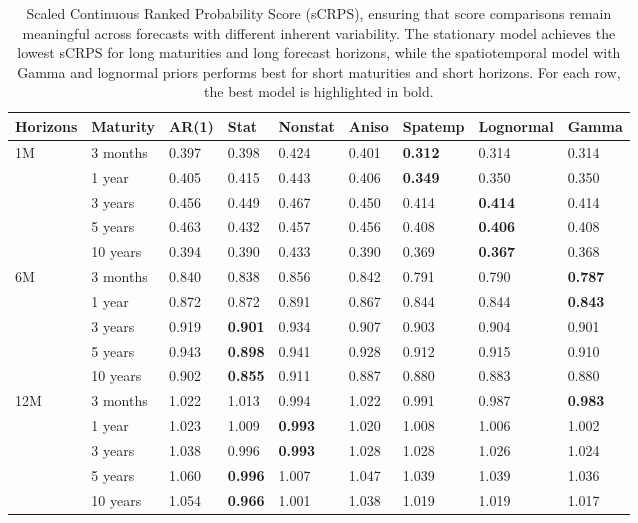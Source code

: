 \documentclass[
  12pt]{article}
\begin{document}
\begin{table}[t!p]
    \centering
    \caption{Scaled Continuous Ranked Probability Score (sCRPS), ensuring that score comparisons remain meaningful across forecasts with different inherent variability. The stationary model achieves the lowest sCRPS for long maturities and long forecast horizons, while the spatiotemporal model with Gamma and lognormal priors performs best for short maturities and short horizons. For each row, the best model is highlighted in bold.}
    \begin{tabular}{l l l l l l l l l }
    \hline
        Horizons & Maturity & AR(1) & Stat & Nonstat & Aniso & Spatemp & Lognormal & Gamma \\ \hline
        1M & 3 months & 0.397 & 0.398 & 0.424 & 0.401 & \textbf{0.312} & 0.314 &	0.314 \\ 
        ~ & 1 year & 0.405 & 0.415 & 0.443 & 0.406 & \textbf{0.349} & 0.350 & 0.350 \\ 
        ~ & 3 years & 0.456 & 0.449 & 0.467 & 0.450 & 0.414 & \textbf{0.414}	& 0.414 \\ 
        ~ & 5 years & 0.463 & 0.432 & 0.457 & 0.456 & 0.408 & \textbf{0.406} & 0.408 \\ 
        ~ & 10 years & 0.394 & 0.390 & 0.433 & 0.390 & 0.369 & \textbf{0.367} & 0.368 \\ \hline
        6M & 3 months & 0.840 & 0.838 & 0.856 & 0.842 & 0.791 & 0.790 & \textbf{0.787} \\ 
        ~ & 1 year & 0.872 & 0.872 & 0.891 & 0.867 & 0.844 & 0.844 & \textbf{0.843} \\ 
        ~ & 3 years & 0.919 & \textbf{0.901} & 0.934 & 0.907 & 0.903 & 0.904	& 0.901 \\ 
        ~ & 5 years & 0.943 & \textbf{0.898} & 0.941 & 0.928 & 0.912 & 0.915 & 0.910 \\ 
        ~ & 10 years & 0.902 & \textbf{0.855} & 0.911 & 0.887 & 0.880 & 0.883 & 0.880 \\ \hline
        12M & 3 months & 1.022 & 1.013 & 0.994 & 1.022 & 0.991 & 0.987 & \textbf{0.983} \\ 
        ~ & 1 year & 1.023 & 1.009 & \textbf{0.993} & 1.020 & 1.008 & 1.006 & 1.002 \\
        ~ & 3 years & 1.038 & 0.996 & \textbf{0.993} & 1.028 & 1.028 & 1.026 & 1.024 \\ 
        ~ & 5 years & 1.060 & \textbf{0.996} & 1.007 & 1.047 & 1.039 & 1.039 & 1.036 \\ 
        ~ & 10 years & 1.054 & \textbf{0.966} & 1.001 & 1.038 & 1.019 & 1.019 & 1.017 \\ \hline
    \end{tabular}
    \label{scrps}
\end{table}
\end{document}
